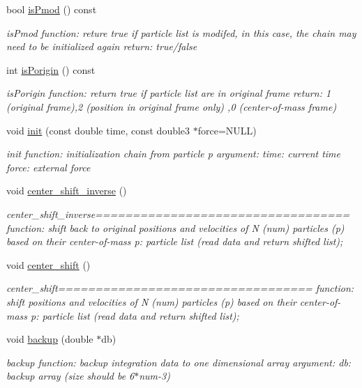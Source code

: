 \begin{DoxyCompactItemize}
bool \hyperlink{classchain_a45e5bde36e12c0388b175983c8f4b9cf}{is\+Pmod} () const
\begin{DoxyCompactList}\small\item\em is\+Pmod function\+: reture true if particle list is modifed, in this case, the chain may need to be initialized again return\+: true/false \end{DoxyCompactList}\item 
int \hyperlink{classchain_aa0716fdbd7717da18d32b0c5161f108f}{is\+Porigin} () const
\begin{DoxyCompactList}\small\item\em is\+Porigin function\+: return true if particle list are in original frame return\+: 1 (original frame),2 (position in original frame only) ,0 (center-\/of-\/mass frame) \end{DoxyCompactList}\item 
void \hyperlink{classchain_ab8d6469cd14e32f5ee3b5aba24bdc601}{init} (const double time, const double3 $\ast$force=N\+U\+LL)
\begin{DoxyCompactList}\small\item\em init function\+: initialization chain from particle p argument\+: time\+: current time force\+: external force \end{DoxyCompactList}\item 
void \hyperlink{classchain_a623ee5de9bc2a5548e2e3b026fa083d9}{center\+\_\+shift\+\_\+inverse} ()
\begin{DoxyCompactList}\small\item\em center\+\_\+shift\+\_\+inverse================================== function\+: shift back to original positions and velocities of N (num) particles (p) based on their center-\/of-\/mass p\+: particle list (read data and return shifted list); \end{DoxyCompactList}\item 
void \hyperlink{classchain_a4282f016d3dd10774815ba7c32c0e021}{center\+\_\+shift} ()
\begin{DoxyCompactList}\small\item\em center\+\_\+shift================================== function\+: shift positions and velocities of N (num) particles (p) based on their center-\/of-\/mass p\+: particle list (read data and return shifted list); \end{DoxyCompactList}\item 
void \hyperlink{classchain_ac7b6422d8e7772461c4cde99916a4b6a}{backup} (double $\ast$db)
\begin{DoxyCompactList}\small\item\em backup function\+: backup integration data to one dimensional array argument\+: db\+: backup array (size should be 6$\ast$num-\/3) \end{DoxyCompactList}\item 

\end{DoxyCompactItemize}
